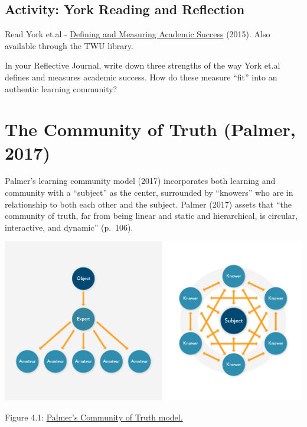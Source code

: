 \documentclass[
]{book}
\begin{document}
\hypertarget{activity-york-reading-and-reflection}{%
\subsection*{Activity: York Reading and Reflection}\label{activity-york-reading-and-reflection}}

\begin{reflect}
Read York et.al - \href{https://eric.ed.gov/?q=EJ1059739}{Defining and
Measuring Academic Success} (2015). Also available through the TWU
library.

In your Reflective Journal, write down three strengths of the way York
et.al defines and measures academic success. How do these measure
``fit'' into an authentic learning community?
\end{reflect}

\hypertarget{the-community-of-truth-palmer-2017}{%
\section{The Community of Truth (Palmer, 2017)}\label{the-community-of-truth-palmer-2017}}

Palmer's learning community model (2017) incorporates both learning and community with a ``subject'' as the center, surrounded by ``knowers'' who are in relationship to both each other and the subject. Palmer (2017) assets that ``the community of truth, far from being linear and static and hierarchical, is circular, interactive, and dynamic'' (p.~106).

\includegraphics{assets/unit4/ParkerDiscussion.jpg}

Figure 4.1: \href{https://uncc.instructure.com/courses/342/pages/module-3-why-discussions}{Palmer's Community of Truth model.}
\end{document}
